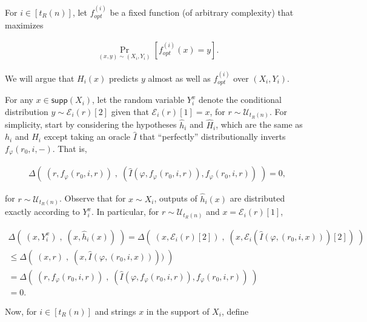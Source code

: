 For $i\in[t_{R}(n)]$, let $f_{opt}^{(i)}$ be a fixed function (of arbitrary complexity) that maximizes\par


\[\begin{gathered}
\Pr_{(x,y)\sim(X_{i},Y_{i})}[f_{opt}^{(i)}(x)=y].
\end{gathered}\]


We will argue that $H_{i}(x)$ predicts $y$ almost as well as $f_{opt}^{(i)}$ over $(X_{i},Y_{i})$.\par




For any $x\in{\mathsf{supp}}(X_{i})$, let the random variable $Y_{i}^{x}$ denote the conditional distribution $y\sim\mathcal{E}_{i}(r)[2]$ given that $\mathcal{E}_{i}(r)[1]=x$, for $r\sim\mathcal{U}_{t_{R}(n)}$. For simplicity, start by considering the hypotheses $\hat{h}_{i}$ and $\hat{H}_{i}$, which are the same as $h_{i}$ and $H_{i}$ except taking an oracle $\hat{I}$ that “perfectly” distributionally inverts $f_{\varphi}(r_{0},i,-)$. That is,\par


\[\begin{gathered}
\displaystyle\Delta\left(\;(r,f_{\varphi}(r_{0},i,r))\;,\;(\hat{I}(\varphi,f_{\varphi}(r_{0},i,r)),f_{\varphi}(r_{0},i,r))\;\right)=0,
\end{gathered}\]


for $r\sim\mathcal{U}_{t_{R}(n)}$. Observe that for $x\sim X_{i}$, outputs of $\hat{h}_{i}(x)$ are distributed exactly according to $Y_{i}^{x}$. In particular, for $r\sim\mathcal{U}_{t_{R}(n)}$ and $x=\mathcal{E}_{i}(r)[1]$,\par


\[\begin{gathered}
\displaystyle\Delta\left(\;(x,Y^{x}_{i})\;,\;(x,\hat{h}_{i}(x))\;\right) \displaystyle=\Delta\left(\;(x,\mathcal{E}_{i}(r)[2])\;,\;(x,\mathcal{E}_{i}(\hat{I}(\varphi,(r_{0},i,x)))[2])\;\right) \\
\displaystyle\leq\Delta\left(\;(x,r)\;,\;(x,\hat{I}(\varphi,(r_{0},i,x))))\;\right) \\
\displaystyle=\Delta\left(\;(r,f_{\varphi}(r_{0},i,r))\;,\;(\hat{I}(\varphi,f_{\varphi}(r_{0},i,r)),f_{\varphi}(r_{0},i,r))\;\right) \\
\displaystyle=0.
\end{gathered}\]


Now, for $i\in[t_{R}(n)]$ and strings $x$ in the support of $X_{i}$, define\par


